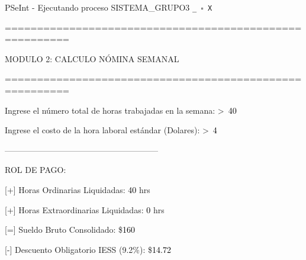 \documentclass[12pt,a4paper]{article}
\newcommand{\consola}[1]{\noindent\textcolor{pseString}{#1}}
\newcommand{\entrada}[1]{\textcolor{black}{#1}}
\newenvironment{PSeIntWindow}{%
	\begin{tcolorbox}[
		breakable,
		enhanced,
		colback=white,
		colframe=black!60,
		boxrule=0.5pt,
		arc=1mm,
		left=0mm,
		right=0mm,
		top=0mm,
		bottom=2mm,
		width=\textwidth
		]
	}{%
	\end{tcolorbox}
}
\newcommand{\BarraPSeInt}{%
	\colorbox{gray!20}{%
		\parbox{\dimexpr\textwidth-2\fboxsep\relax}{%
			\small
			\textcolor{pseString}{\faPlayCircle}
			\hspace{0.3em}
			PSeInt - Ejecutando proceso SISTEMA\_GRUPO3
			\hfill
			\texttt{\_ \hspace{0.5em} \(\square\) \hspace{0.5em} X}
		}
	}
}
\begin{document}
\begin{PSeIntWindow}
	
	\BarraPSeInt
	
	\vspace{0.2cm}
	
	\ttfamily
	\small
	
	\consola{========================================================}\par
	
	\begin{center}
		\textcolor{pseString}{MODULO 2: CALCULO NÓMINA SEMANAL}
	\end{center}
	
	\consola{========================================================}\par
	
	\vspace{0.3cm}
	
	\consola{Ingrese el número total de horas trabajadas en la semana: \textgreater\ }\entrada{40}\par
	
	\consola{Ingrese el costo de la hora laboral estándar (Dolares): \textgreater\ }\entrada{4}\par
	
	\vspace{0.3cm}
	
	\consola{--------------------------------------------------------}\par
	
	\vspace{0.2cm}
	
	\consola{ROL DE PAGO:}\par
	
	\vspace{0.2cm}
	
	\consola{\hspace*{0.5cm}[+] Horas Ordinarias Liquidadas: }\entrada{40}\consola{ hrs}\par
	
	\consola{\hspace*{0.5cm}[+] Horas Extraordinarias Liquidadas: }\entrada{0}\consola{ hrs}\par
	
	\consola{\hspace*{0.5cm}[=] Sueldo Bruto Consolidado: \$}\entrada{160}\par
	
	\consola{\hspace*{0.5cm}[-] Descuento Obligatorio IESS (9.2\%): \$}\entrada{14.72}\par
	

\end{PSeIntWindow}
\end{document}
